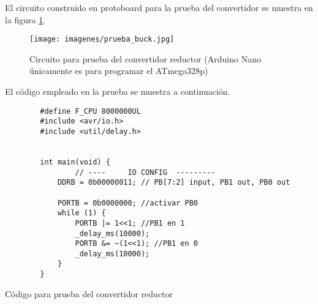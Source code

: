 El circuito construido en protoboard para la prueba del convertidor se muestra
en la figura \ref{fig:prueba_buck}.

\begin{figure}[H]	
    \centering
    \texttt{[image: imagenes/prueba\_buck.jpg]}
    \caption{Circuito para prueba del convertidor reductor (Arduino Nano únicamente
    es para programar el ATmega328p)} 
    \label{fig:prueba_buck}
\end{figure}

El código empleado en la prueba se muestra a continuación.

\begin{table}[H]
    \begin{lstlisting}
        #define F_CPU 8000000UL
        #include <avr/io.h>
        #include <util/delay.h>


        int main(void) {
                // ----     IO CONFIG  ---------
            DDRB = 0b00000011; // PB[7:2] input, PB1 out, PB0 out
            
            PORTB = 0b0000000; //activar PB0
            while (1) {
                PORTB |= 1<<1; //PB1 en 1
                _delay_ms(10000);
                PORTB &= ~(1<<1); //PB1 en 0
                _delay_ms(10000);
            }
        }

    \end{lstlisting}
    \caption{Código para prueba del convertidor reductor}
\end{table}
